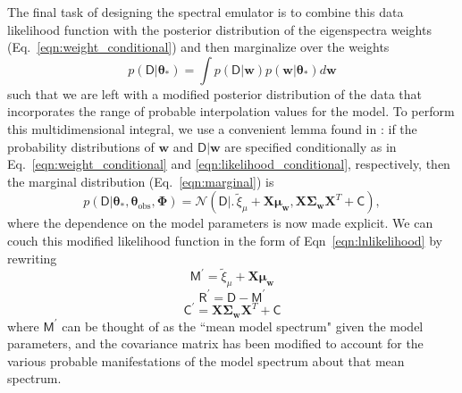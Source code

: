 \documentclass[iop,floatfix,numberedappendix,twocolappendix]{emulateapj}
\newcommand{\vt}{ {\bm \theta}}
\begin{document}
The final task of designing the spectral emulator is to combine this data likelihood function with the posterior distribution of the eigenspectra weights (Eq.~\ref{eqn:weight_conditional}) and then marginalize over the weights
\begin{equation}
  p(\mathsf{D} | \vt_\ast) = \int p(\mathsf{D} | \mathbf{w}) p( \mathbf{w} | \vt_\ast) d \mathbf{w}
  \label{eqn:marginal}
\end{equation}
such that we are left with a modified posterior distribution of the data that incorporates the 
range of probable interpolation values for the model.  To perform this multidimensional integral, 
we use a convenient lemma found in \citet[their Appendix A]{gelman13}: if the probability 
distributions of $\mathbf{w}$ and $\mathsf{D} | \mathbf{w}$ are specified conditionally as in 
Eq.~\ref{eqn:weight_conditional} and \ref{eqn:likelihood_conditional}, respectively, then the 
marginal distribution (Eq.~\ref{eqn:marginal}) is
\begin{equation}
  p(\mathsf{D} | \vt_\ast, \vt_\textrm{obs}, \mathbf{\Phi}) = \mathcal{N} \left ( \mathsf{D} \bigl | \bigr .\, \widetilde{\xi}_\mu + \mathbf{X} \mathbf{\mu}_\mathbf{w}, \mathbf{X} \mathbf{\Sigma}_\mathbf{w} \mathbf{X}^T + \mathsf{C} \right),
\end{equation}
where the dependence on the model parameters is now made explicit.  We can couch this modified 
likelihood function in the form of Eqn~\ref{eqn:lnlikelihood} by rewriting
\begin{equation}
  \mathsf{M}^\prime = \widetilde{\xi}_\mu + \mathbf{X} \mathbf{\mu}_\mathbf{w}
\end{equation}
\begin{equation}
  \mathsf{R}^\prime = \mathsf{D} - \mathsf{M}^\prime 
\end{equation}
\begin{equation}
  \mathsf{C}^\prime = \mathbf{X} \mathbf{\Sigma}_\mathbf{w} \mathbf{X}^T + \mathsf{C}
  \label{eqn:modC}
\end{equation}
where $\mathsf{M}^\prime$ can be thought of as the ``mean model spectrum" given the model 
parameters, and the covariance matrix has been modified to account for the various probable 
manifestations of the model spectrum about that mean spectrum.


%
\end{document}
